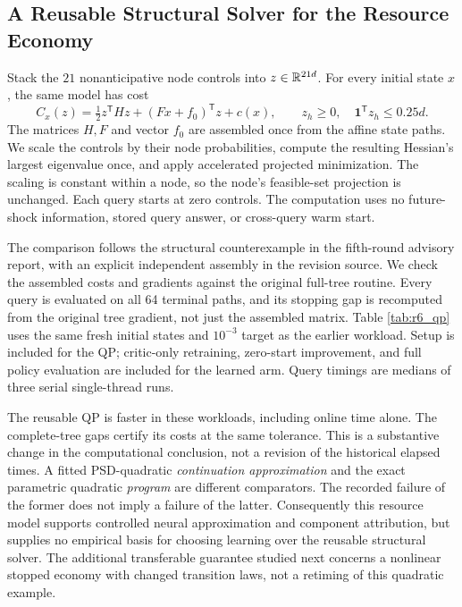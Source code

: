 \subsection{A Reusable Structural Solver for the Resource Economy}
\label{sec:structural_qp}
Stack the $21$ nonanticipative node controls into $z\in\mathbb R^{21d}$. For every initial state $x$, the same model has cost
\begin{equation}
 C_x(z)=\tfrac12z^{\mathsf T}Hz+(Fx+f_0)^{\mathsf T}z+c(x),
 \qquad z_h\geq0,\quad\mathbf1^{\mathsf T}z_h\leq0.25d.
 \label{eq:reusable_qp}
\end{equation}
The matrices $H,F$ and vector $f_0$ are assembled once from the affine state paths. We scale the controls by their node probabilities, compute the resulting Hessian's largest eigenvalue once, and apply accelerated projected minimization. The scaling is constant within a node, so the node's feasible-set projection is unchanged. Each query starts at zero controls. The computation uses no future-shock information, stored query answer, or cross-query warm start.

The comparison follows the structural counterexample in the fifth-round advisory report, with an explicit independent assembly in the revision source. We check the assembled costs and gradients against the original full-tree routine. Every query is evaluated on all 64 terminal paths, and its stopping gap is recomputed from the original tree gradient, not just the assembled matrix. Table \ref{tab:r6_qp} uses the same fresh initial states and $10^{-3}$ target as the earlier workload. Setup is included for the QP; critic-only retraining, zero-start improvement, and full policy evaluation are included for the learned arm. Query timings are medians of three serial single-thread runs.

The reusable QP is faster in these workloads, including online time alone. The complete-tree gaps certify its costs at the same tolerance. This is a substantive change in the computational conclusion, not a revision of the historical elapsed times. A fitted PSD-quadratic \emph{continuation approximation} and the exact parametric quadratic \emph{program} are different comparators. The recorded failure of the former does not imply a failure of the latter. Consequently this resource model supports controlled neural approximation and component attribution, but supplies no empirical basis for choosing learning over the reusable structural solver. The additional transferable guarantee studied next concerns a nonlinear stopped economy with changed transition laws, not a retiming of this quadratic example.


